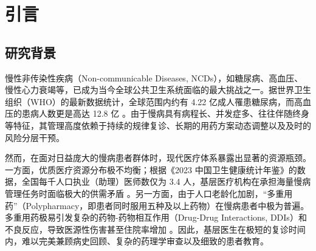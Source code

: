 \documentclass[11pt,a4paper]{ctexart}
\begin{document}
\begin{abstract}
\noindent \textbf{Conclusions:} This research corroborates that a Compute-Optimal multi-agent debate architecture functions as a robust safety guardrail for high-risk medical AI applications. By disproportionately allocating inference compute to complex, high-risk cases, Micro-MDT significantly enhances the interpretability and safety of medical recommendations while maintaining an exceptionally low average inference cost (estimated at  per case). This system provides a valuable theoretical framework and an open-source empirical reference for proactive abstention mechanisms and human-machine collaborative paradigms in clinical AI.

\vspace{1em}
\noindent \textbf{Keywords:} Multi-Agent Systems; Large Language Models; Test-Time Compute Scaling; Medical AI Safety; Human-in-the-Loop; Chronic Disease Management
\end{abstract}

\newpage
\tableofcontents
\newpage

\setcounter{page}{1}
\section{引言}

\subsection{研究背景}

慢性非传染性疾病（Non-communicable Diseases, NCDs），如糖尿病、高血压、慢性心力衰竭等，已成为当今全球公共卫生系统面临的最大挑战之一。据世界卫生组织（WHO）的最新数据统计，全球范围内约有 4.22 亿成人罹患糖尿病，而高血压的患病人数更是高达 12.8 亿 \cite{world2024diabetes}。由于慢病具有病程长、并发症多、往往伴随终身等特征，其管理高度依赖于持续的规律复诊、长期的用药方案动态调整以及及时的风险分层干预。

然而，在面对日益庞大的慢病患者群体时，现代医疗体系暴露出显著的资源瓶颈。一方面，优质医疗资源分布极不均衡；根据《2023 中国卫生健康统计年鉴》的数据，全国每千人口执业（助理）医师数仅为 3.4 人，基层医疗机构在承担海量慢病管理任务时面临极大的供需矛盾 \cite{china2023health}。另一方面，由于人口老龄化加剧，“多重用药”（Polypharmacy，即患者同时服用五种及以上药物）在慢病患者中极为普遍。多重用药极易引发复杂的药物-药物相互作用（Drug-Drug Interactions, DDIs）和不良反应，导致医源性伤害甚至住院率增加 \cite{maher2014clinical}。因此，基层医生在极短的复诊时间内，难以完美兼顾病史回顾、复杂的药理学审查以及细致的患者教育。
\end{document}
